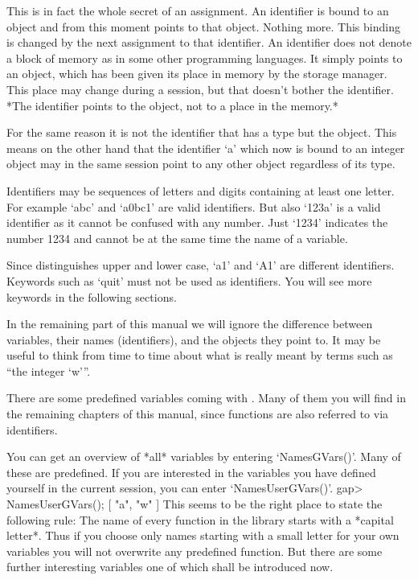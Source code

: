 This is in fact the whole secret of an assignment. An identifier is bound
to an  object and from this moment  points to that object.  Nothing more.
This binding  is changed by the  next  assignment to that  identifier. An
identifier does not denote a block of memory as in some other programming
languages. It simply points to an object, which has  been given its place
in memory by the {\GAP} storage manager.   This place may change during a
{\GAP} session, but that doesn't  bother the identifier.  *The identifier
points to the object, not to a place in the memory.*

For the  same reason it is  not the  identifier that has   a type but the
object.  This means  on the other hand that  the identifier `a' which now
is bound to an integer object may in the  same session point to any other
object regardless of its type.

Identifiers  may be sequences  of letters and digits containing at  least
one letter.   For example  `abc' and `a0bc1'  are valid identifiers.  But
also `123a'  is  a valid identifier as  it cannot be  confused  with  any
number.  Just `1234' indicates the  number 1234 and cannot be at the same
time the name of a variable.

Since  {\GAP} distinguishes  upper and  lower  case, `a1'  and  `A1'  are
different  identifiers.   Keywords  such as `quit'  must not  be used  as
identifiers.  You will see more keywords in the following sections.

In  the remaining  part of  this manual   we  will ignore the  difference
between variables, their names  (identifiers), and the objects they point
to.  It may be useful  to think from time  to  time about what is  really
meant by terms such as ``the integer `w'''.

There are some predefined variables coming with {\GAP}.  Many of them you
will find in the remaining  chapters of  this manual, since functions are
also referred to via identifiers.

You    can get   an  overview   of  *all*  {\GAP}   variables by entering
`NamesGVars()'.  Many of these are predefined.  If  you are interested in
the variables you  have defined yourself  in the current {\GAP}  session,
you can enter `NamesUserGVars()'.
\begintt
    gap> NamesUserGVars();
    [ "a", "w" ]
\endtt
This seems to be the  right place to state the  following rule:  The name
of  every function in the {\GAP}  library starts with a *capital letter*.
Thus if you choose  only names starting with a  small letter for your own
variables you will  not overwrite any predefined  function. But there are
some further interesting variables one of which shall be introduced now.

